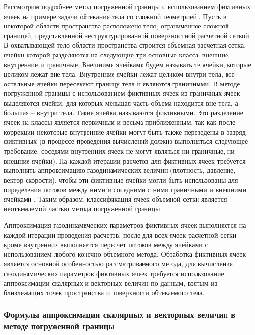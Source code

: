 Рассмотрим подробнее метод погруженной границы с использованием фиктивных ячеек \cite{Peter2016Immersed} на примере задачи обтекания тела со сложной геометрией \cite{Rybakov2020GeoIBM}.
Пусть в некоторой области пространства расположено тело, ограниченное сложной границей, представленной неструктурированной поверхностной расчетной сеткой.
В охватывающей тело области пространства строится объемная расчетная сетка, ячейки которой разделяются на следующие три основные класса: внешние\label{term:cell_ibm_outer}, внутренние\label{term:cell_ibm_innner} и граничные\label{term:cell_ibm_border}.
Внешними ячейками будем называть те ячейки, которые целиком лежат вне тела.
Внутренние ячейки лежат целиком внутри тела, все остальные ячейки пересекают границу тела и являются граничными.
В методе погруженной границы с использованием фиктивных ячеек из граничных ячеек выделяются ячейки, для которых меньшая часть объема находится вне тела, а большая -- внутри тела.
Такие ячейки называются фиктивными.
Это разделение ячеек на классы является первичным и весьма приближенным, так как после коррекции некоторые внутренние ячейки могут быть также переведены в разряд фиктивных (в процессе проведения вычислений должно выполняться следующее требование: соседями внутренних ячеек не могут являться ни граничные, ни внешние ячейки).
На каждой итерации расчетов для фиктивных ячеек требуется выполнить аппроксимацию газодинамических величин (плотность, давление, вектор скорости), чтобы эти фиктивные ячейки могли быть использованы для определения потоков между ними и соседними с ними граничными и внешними ячейками \cite{Vinnikov2007Immersed}.
Таким образом, классификация ячеек объемной сетки является неотъемлемой частью метода погруженной границы.

Аппроксимация газодинамических параметров фиктивных ячеек выполняется на каждой итерации проведения расчетов, после для всех ячеек расчетной сетки кроме внутренних выполняется пересчет потоков между ячейками с использованием любого конечно-объемного метода. Обработка фиктивных ячеек является основной особенностью рассматриваемого метода, для вычисления газодинамических параметров фиктивных ячеек требуется использование аппроксимации скалярных и векторных величин по данным, взятым из близлежащих точек пространства и поверхности обтекаемого тела.

\subsubsection{Формулы аппроксимации скалярных и векторных величин в методе погруженной границы}

